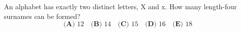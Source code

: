 An alphabet has exactly two distinct letters, X and x. How many length-four surnames can be formed?
\[\textbf{(A) }12\quad\textbf{(B) }14\quad\textbf{(C) }15\quad\textbf{(D) }16\quad\textbf{(E) }18\]
